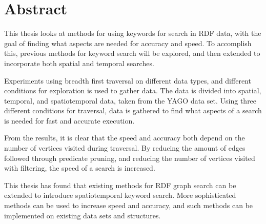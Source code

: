 \section*{Abstract}
This thesis looks at methods for using keywords for search in RDF data, with the goal of finding what aspects are needed for accuracy and speed. To accomplish this, previous methods for keyword search will be explored, and then extended to incorporate both spatial and temporal searches.  

Experiments using breadth first traversal on different data types, and different conditions for exploration is used to gather data. The data is divided into spatial, temporal, and spatiotemporal data, taken from the YAGO data set. Using three different conditions for traversal, data is gathered to find what aspects of a search is needed for fast and accurate execution. 

From the results, it is clear that the speed and accuracy both depend on the number of vertices visited during traversal. By reducing the amount of edges followed through predicate pruning, and reducing the number of vertices visited with filtering, the speed of a search is increased. 

This thesis has found that existing methods for RDF graph search can be extended to introduce spatiotemporal keyword search. More sophisticated methods can be used to increase speed and accuracy, and such methods can be implemented on existing data sets and structures.